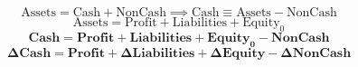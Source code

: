 \begin{equation}
    \text{Assets} = \text{Cash} + \text{NonCash} \implies \text{Cash} \equiv \text{Assets} - \text{NonCash}
\end{equation}
\begin{equation}
    \text{Assets} = \text{Profit} + \text{Liabilities} + \text{Equity}_0
\end{equation}
\begin{equation}
    \mathbf{\text{Cash} = \text{Profit} + \text{Liabilities} + \text{Equity}_0 - \text{NonCash}}
\end{equation}
\begin{equation}
    \mathbf{\Delta \text{Cash} = \text{Profit} + \Delta \text{Liabilities} + \Delta \text{Equity} - \Delta \text{NonCash}}
\end{equation}
